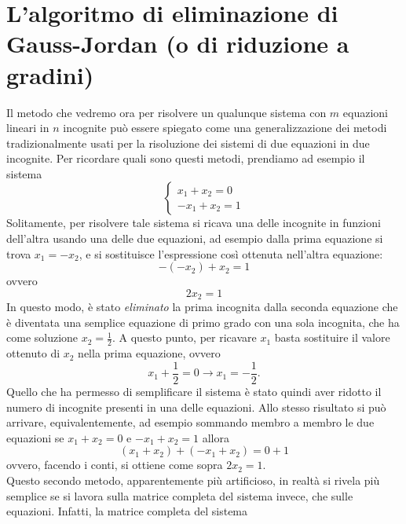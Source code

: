 \section{L'algoritmo di eliminazione di Gauss-Jordan (o di riduzione a gradini)}
\label{sec:gauss-jordan}
Il metodo che vedremo ora per risolvere un qualunque sistema con $m$
equazioni lineari in $n$ incognite può essere spiegato come una
generalizzazione dei metodi tradizionalmente usati per la risoluzione dei
sistemi di due equazioni in due incognite. Per ricordare quali sono
questi metodi, prendiamo ad esempio il sistema
\begin{equation}
  \label{eq:gauss-jorda1}
  \begin{cases}
    x_1+x_2=0\\
    -x_1+x_2=1
  \end{cases}
\end{equation}
Solitamente, per risolvere tale sistema si ricava una delle incognite in
funzioni dell'altra usando una delle due equazioni, ad esempio dalla prima
equazione si trova $x_1=-x_2$, e si sostituisce l'espressione così
ottenuta nell'altra equazione:
\begin{equation*}
  -(-x_2)+x_2=1
\end{equation*}
ovvero
\begin{equation*}
  2x_2=1
\end{equation*}
In questo modo, è stato \emph{eliminato} la prima incognita dalla seconda
equazione che è diventata una semplice equazione di primo grado con una
sola incognita, che ha come soluzione $x_2=\frac{1}{2}$. A questo punto,
per ricavare $x_1$ basta sostituire il valore ottenuto di $x_2$ nella
prima equazione, ovvero
\begin{equation*}
  x_1+\frac{1}{2}=0 \to x_1=-\frac{1}{2}.
\end{equation*}
Quello che ha permesso di semplificare il sistema è stato quindi aver
ridotto il numero di incognite presenti in una delle equazioni. Allo
stesso risultato si può arrivare, equivalentemente, ad esempio sommando
membro a membro le due equazioni se $x_1+x_2=0$ e $-x_1+x_2=1$ allora
\begin{equation*}
  (x_1+x_2)+(-x_1+x_2)=0+1
\end{equation*}
ovvero, facendo i conti, si ottiene come sopra $2x_2=1$.\\
Questo secondo metodo, apparentemente più artificioso, in realtà si rivela
più semplice se si lavora sulla matrice completa del sistema invece, che
sulle equazioni. Infatti, la matrice completa del sistema
